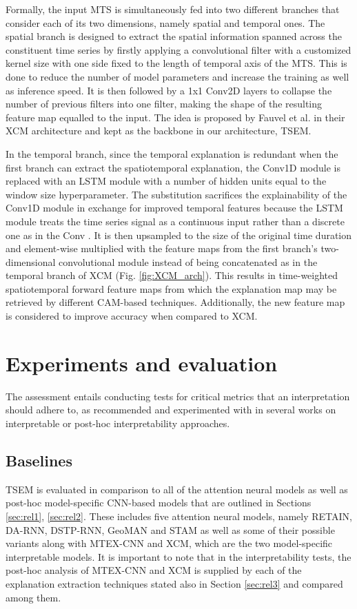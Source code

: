 \documentclass{svproc}
\begin{document}
Formally, the input MTS is simultaneously fed into two different branches that consider each of its two dimensions, namely spatial and temporal ones. The spatial branch is designed to extract the spatial information spanned across the constituent time series by firstly applying a convolutional filter with a customized kernel size with one side fixed to the length of temporal axis of the MTS. This is done to reduce the number of model parameters and increase the training as well as inference speed. It is then followed by a 1x1 Conv2D layers to collapse the number of previous filters into one filter, making the shape of the resulting feature map equalled to the input. The idea is proposed by Fauvel et al. \cite{fauvel2021xcm} in their XCM architecture and kept as the backbone in our architecture, TSEM.

In the temporal branch, since the temporal explanation is redundant when the first branch can extract the spatiotemporal explanation, the Conv1D module is replaced with an LSTM module with a number of hidden units equal to the window size hyperparameter. The substitution sacrifices the explainability of the Conv1D module in exchange for improved temporal features because the LSTM module treats the time series signal as a continuous input rather than a discrete one as in the Conv . It is then upsampled to the size of the original time duration and element-wise multiplied with the feature maps from the first branch's two-dimensional convolutional module instead of being concatenated as in the temporal branch of XCM (Fig. \ref{fig:XCM_arch}). This results in time-weighted spatiotemporal forward feature maps from which the explanation map may be retrieved by different CAM-based techniques. Additionally, the new feature map is considered to improve accuracy when compared to XCM.
\section{Experiments and evaluation}
The assessment entails conducting tests for critical metrics that an interpretation should adhere to, as recommended and experimented with in several works on interpretable or post-hoc interpretability approaches.
\subsection{Baselines}

TSEM is evaluated in comparison to all of the attention neural models as well as post-hoc model-specific CNN-based models that are outlined in Sections \ref{sec:rel1}, \ref{sec:rel2}. These includes five attention neural models, namely RETAIN, DA-RNN, DSTP-RNN, GeoMAN and STAM as well as some of their possible variants along with MTEX-CNN and XCM, which are the two model-specific interpretable models. It is important to note that in the interpretability tests, the post-hoc analysis of MTEX-CNN and XCM is supplied by each of the explanation extraction techniques stated also in Section \ref{sec:rel3} and compared among them.
\end{document}
